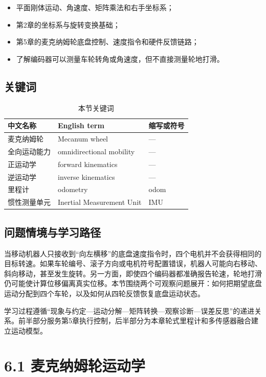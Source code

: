 \documentclass[UTF8,zihao=-4]{ctexart}
\begin{document}
\begin{itemize}
  \item 平面刚体运动、角速度、矩阵乘法和右手坐标系；
  \item 第2章的坐标系与旋转变换基础；
  \item 第5章的麦克纳姆轮底盘控制、速度指令和硬件反馈链路；
  \item 了解编码器可以测量车轮转角或角速度，但不直接测量轮地打滑。
\end{itemize}

\subsection*{关键词}

\begin{table}[htbp]
  \centering
  \caption*{本节关键词}
  \begin{tabular}{lll}
    \toprule
    中文名称 & English term & 缩写或符号 \\
    \midrule
    麦克纳姆轮 & Mecanum wheel & --- \\
    全向运动能力 & omnidirectional mobility & --- \\
    正运动学 & forward kinematics & --- \\
    逆运动学 & inverse kinematics & --- \\
    里程计 & odometry & odom \\
    惯性测量单元 & Inertial Measurement Unit & IMU \\
    \bottomrule
  \end{tabular}
\end{table}

\subsection*{问题情境与学习路径}

当移动机器人只接收到“向左横移”的底盘速度指令时，四个电机并不会获得相同的目标转速。如果车轮编号、滚子方向或电机符号配置错误，机器人可能向右移动、斜向移动，甚至发生旋转。另一方面，即使四个编码器都准确报告轮速，轮地打滑仍可能使计算位移偏离真实位移。本节围绕两个可观察问题展开：如何把期望底盘运动分配到四个车轮，以及如何从四轮反馈恢复底盘运动状态。

学习过程遵循“现象与约定---运动分解---矩阵转换---观察诊断---误差反思”的递进关系。前半部分服务第5章执行控制，后半部分为本章轮式里程计和多传感器融合建立运动模型。

\section*{6.1 麦克纳姆轮运动学}
\end{document}
